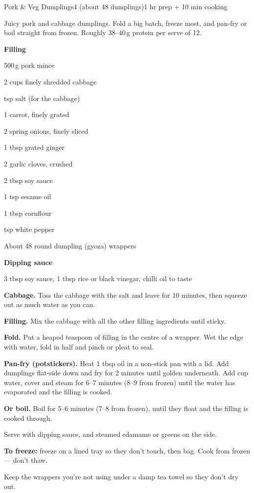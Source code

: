 \begin{recipebox}{Pork \& Veg Dumplings}{4 (about 48 dumplings)}{1 hr prep + 10 min cooking}

Juicy pork and cabbage dumplings. Fold a big batch, freeze most, and pan-fry
or boil straight from frozen. Roughly 38--40\,g protein per serve of 12.

\begin{ingredients}
  \item[] \textbf{Filling}
  \item 500\,g pork mince
  \item 2 cups finely shredded cabbage
  \item {} tsp salt (for the cabbage)
  \item 1 carrot, finely grated
  \item 2 spring onions, finely sliced
  \item 1 tbsp grated ginger
  \item 2 garlic cloves, crushed
  \item 2 tbsp soy sauce
  \item 1 tsp sesame oil
  \item 1 tbsp cornflour
  \item {} tsp white pepper
  \item About 48 round dumpling (gyoza) wrappers
  \item[] \textbf{Dipping sauce}
  \item 3 tbsp soy sauce, 1 tbsp rice or black vinegar, chilli oil to taste
\end{ingredients}

\begin{method}
  \item \textbf{Cabbage.} Toss the cabbage with the salt and leave for 10 minutes, then squeeze out as much water as you can.
  \item \textbf{Filling.} Mix the cabbage with all the other filling ingredients until sticky.
  \item \textbf{Fold.} Put a heaped teaspoon of filling in the centre of a wrapper. Wet the edge with water, fold in half and pinch or pleat to seal.
  \item \textbf{Pan-fry (potstickers).} Heat 1 tbsp oil in a non-stick pan with a lid. Add dumplings flat-side down and fry for 2 minutes until golden underneath. Add  cup water, cover and steam for 6--7 minutes (8--9 from frozen) until the water has evaporated and the filling is cooked.
  \item \textbf{Or boil.} Boil for 5--6 minutes (7--8 from frozen), until they float and the filling is cooked through.
  \item Serve with dipping sauce, and steamed edamame or greens on the side.
\end{method}

\begin{notelist}
  \item \textbf{To freeze:} freeze on a lined tray so they don't touch, then bag. Cook from frozen --- don't thaw.
  \item Keep the wrappers you're not using under a damp tea towel so they don't dry out.
\end{notelist}

\end{recipebox}
